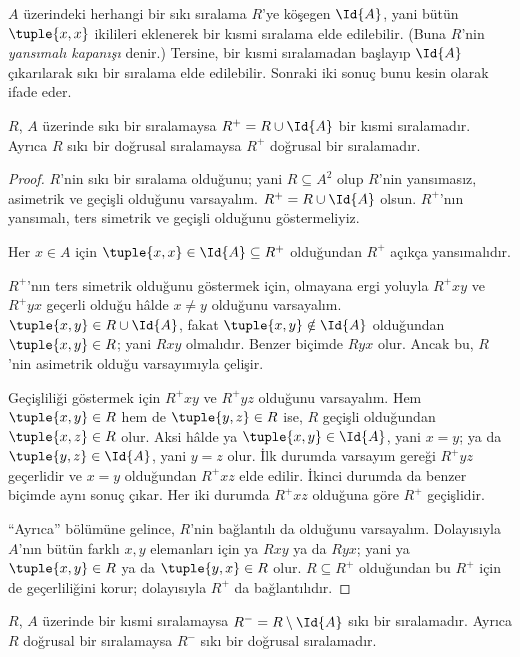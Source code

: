 $A$ üzerindeki herhangi bir sıkı sıralama $R$'ye köşegen $\Id{A}$, yani bütün
$\tuple{x,x}$ ikilileri eklenerek bir kısmi sıralama elde edilebilir. (Buna
$R$'nin \emph{yansımalı kapanışı} denir.) Tersine, bir kısmi sıralamadan
başlayıp $\Id{A}$ çıkarılarak sıkı bir sıralama elde edilebilir. Sonraki iki
sonuç bunu kesin olarak ifade eder.

\begin{prop}
$R$, $A$ üzerinde sıkı bir sıralamaysa $R^+=R\cup\Id{A}$ bir kısmi sıralamadır.
Ayrıca $R$ sıkı bir doğrusal sıralamaysa $R^+$ doğrusal bir sıralamadır.
\end{prop}

\begin{proof}
$R$'nin sıkı bir sıralama olduğunu; yani $R \subseteq A^2$ olup $R$'nin
yansımasız, asimetrik ve geçişli olduğunu varsayalım. $R^+=R\cup\Id{A}$ olsun.
$R^+$'nın yansımalı, ters simetrik ve geçişli olduğunu göstermeliyiz.

Her $x \in A$ için $\tuple{x,x}\in\Id{A}\subseteq R^+$ olduğundan $R^+$
açıkça yansımalıdır.

$R^+$'nın ters simetrik olduğunu göstermek için, olmayana ergi yoluyla $R^+xy$
ve $R^+yx$ geçerli olduğu hâlde $x \neq y$ olduğunu varsayalım.
$\tuple{x,y}\in R\cup\Id{A}$, fakat $\tuple{x,y}\notin\Id{A}$ olduğundan
$\tuple{x,y}\in R$; yani $Rxy$ olmalıdır. Benzer biçimde $Ryx$ olur. Ancak bu,
$R$'nin asimetrik olduğu varsayımıyla çelişir.

Geçişliliği göstermek için $R^+xy$ ve $R^+yz$ olduğunu varsayalım. Hem
$\tuple{x,y}\in R$ hem de $\tuple{y,z}\in R$ ise, $R$ geçişli olduğundan
$\tuple{x,z}\in R$ olur. Aksi hâlde ya $\tuple{x,y}\in\Id{A}$, yani $x=y$;
ya da $\tuple{y,z}\in\Id{A}$, yani $y=z$ olur. İlk durumda varsayım gereği
$R^+yz$ geçerlidir ve $x=y$ olduğundan $R^+xz$ elde edilir. İkinci durumda da
benzer biçimde aynı sonuç çıkar. Her iki durumda $R^+xz$ olduğuna göre $R^+$
geçişlidir.

``Ayrıca'' bölümüne gelince, $R$'nin bağlantılı da olduğunu varsayalım.
Dolayısıyla $A$'nın bütün farklı $x,y$ elemanları için ya $Rxy$ ya da $Ryx$; yani ya
$\tuple{x,y}\in R$ ya da $\tuple{y,x}\in R$ olur. $R\subseteq R^+$ olduğundan
bu $R^+$ için de geçerliliğini korur; dolayısıyla $R^+$ da bağlantılıdır.
\end{proof}

\begin{prop}
$R$, $A$ üzerinde bir kısmi sıralamaysa $R^-=R\setminus\Id{A}$ sıkı bir
sıralamadır. Ayrıca $R$ doğrusal bir sıralamaysa $R^-$ sıkı bir doğrusal
sıralamadır.
\end{prop}

